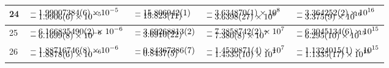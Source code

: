 \documentclass[aip,jcp,preprint,superscriptaddress,showpacs,preprintnumbers,amsmath,amssymb]{revtex4-1}
\begin{document}
\begin{table*}
\begin{tabular}{l l l l l}
\hline
24
&
$\begin{aligned}
&-1.99007384(6)\times10^{-5} \\[\vsp]
&-1.9906(6)\times10^{-5}
\end{aligned}$
&
$\begin{aligned}
&-15.806042(1) \\[\vsp]
&-15.823(11)
\end{aligned}$
&
$\begin{aligned}
&-3.634870(1)\times10^{8} \\[\vsp]
&-3.6398(27)\times10^{8}
\end{aligned}$
&
$\begin{aligned}
&-3.364252(2)\times10^{16} \\[\vsp]
&-3.375(9)\times10^{16}
\end{aligned}$
\\
\hline
25
&
$\begin{aligned}
&-6.166835490(2)\times10^{-6} \\[\vsp]
&-6.1699(8)\times10^{-6}
\end{aligned}$
&
$\begin{aligned}
&-3.69268813(2) \\[\vsp]
&-3.6910(22)
\end{aligned}$
&
$\begin{aligned}
&-7.3858742(2)\times10^{7} \\[\vsp]
&-7.380(8)\times10^{7}
\end{aligned}$
&
$\begin{aligned}
&-6.3045134(6)\times10^{15} \\[\vsp]
&-6.295(10)\times10^{15}
\end{aligned}$
\\
\hline
26
&
$\begin{aligned}
&-1.88716746(8)\times10^{-6} \\[\vsp]
&-1.8878(6)\times10^{-6}
\end{aligned}$
&
$\begin{aligned}
&-0.84367386(7) \\[\vsp]
&-0.8437(5)
\end{aligned}$
&
$\begin{aligned}
&-1.4530871(4)\times10^{7} \\[\vsp]
&-1.4535(10)\times10^{7}
\end{aligned}$
&
$\begin{aligned}
&-1.1324015(1)\times10^{15} \\[\vsp]
&-1.1335(17)\times10^{15}
\end{aligned}$

\end{tabular}
\end{table*}
\end{document}
